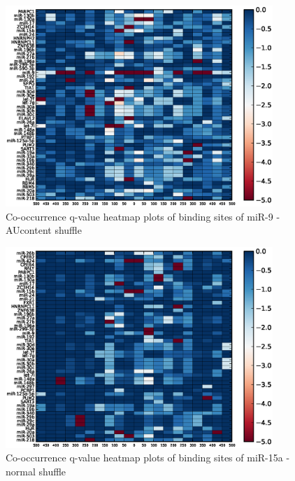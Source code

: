 \begin{figure}
   	\includegraphics[width=0.9\textwidth,clip]{appendix1/figures/miR-9_AUcontent_expressed_heatmap_qvalues0.eps}
   	\caption{Co-occurrence q-value heatmap plots of binding sites of miR-9 - AUcontent shuffle}
\end{figure}
\clearpage
\begin{figure}
   	\includegraphics[width=0.9\textwidth,clip]{appendix1/figures/miR-15a_normal_expressed_heatmap_qvalues0.eps}
   	\caption{Co-occurrence q-value heatmap plots of binding sites of miR-15a - normal shuffle}
\end{figure}

